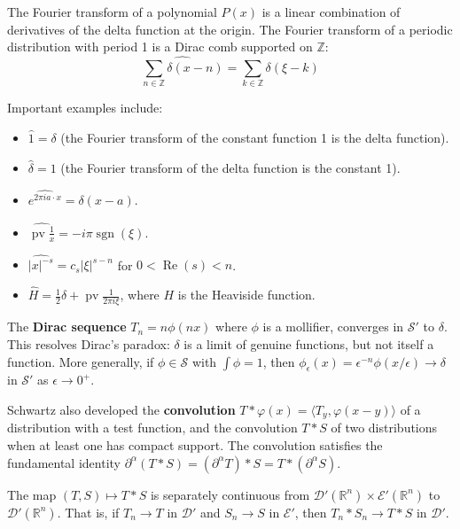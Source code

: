 \begin{corollary}
The Fourier transform of a polynomial $P(x)$ is a linear combination of derivatives of the delta function at the origin. The Fourier transform of a periodic distribution with period 1 is a Dirac comb supported on $\mathbb{Z}$:
\[\widehat{\sum_{n \in \mathbb{Z}} \delta(x-n)} = \sum_{k \in \mathbb{Z}} \delta(\xi - k)\]
\end{corollary}

\begin{example}
Important examples include:
\begin{itemize}
\item $\hat{1} = \delta$ (the Fourier transform of the constant function 1 is the delta function).
\item $\hat{\delta} = 1$ (the Fourier transform of the delta function is the constant 1).
\item $\widehat{e^{2\pi i a \cdot x}} = \delta(x - a)$.
\item $\widehat{\operatorname{pv}\frac{1}{x}} = -i\pi \operatorname{sgn}(\xi)$.
\item $\widehat{|x|^{-s}} = c_s |\xi|^{s-n}$ for $0 < \operatorname{Re}(s) < n$.
\item $\hat{H} = \frac{1}{2}\delta + \operatorname{pv}\frac{1}{2\pi i \xi}$, where $H$ is the Heaviside function.
\end{itemize}
\end{example}

The \textbf{Dirac sequence} $T_n = n \phi(nx)$ where $\phi$ is a mollifier, converges in $\mathcal{S}'$ to $\delta$. This resolves Dirac's paradox: $\delta$ is a limit of genuine functions, but not itself a function. More generally, if $\phi \in \mathcal{S}$ with $\int \phi = 1$, then $\phi_\epsilon(x) = \epsilon^{-n} \phi(x/\epsilon) \to \delta$ in $\mathcal{S}'$ as $\epsilon \to 0^+$.

Schwartz also developed the \textbf{convolution} $T * \varphi(x) = \langle T_y, \varphi(x-y) \rangle$ of a distribution with a test function, and the convolution $T * S$ of two distributions when at least one has compact support. The convolution satisfies the fundamental identity $\partial^\alpha(T * S) = (\partial^\alpha T) * S = T * (\partial^\alpha S)$.

\begin{theorem}
The map $(T, S) \mapsto T * S$ is separately continuous from $\mathcal{D}'(\mathbb{R}^n) \times \mathcal{E}'(\mathbb{R}^n)$ to $\mathcal{D}'(\mathbb{R}^n)$. That is, if $T_n \to T$ in $\mathcal{D}'$ and $S_n \to S$ in $\mathcal{E}'$, then $T_n * S_n \to T * S$ in $\mathcal{D}'$.
\end{theorem}

